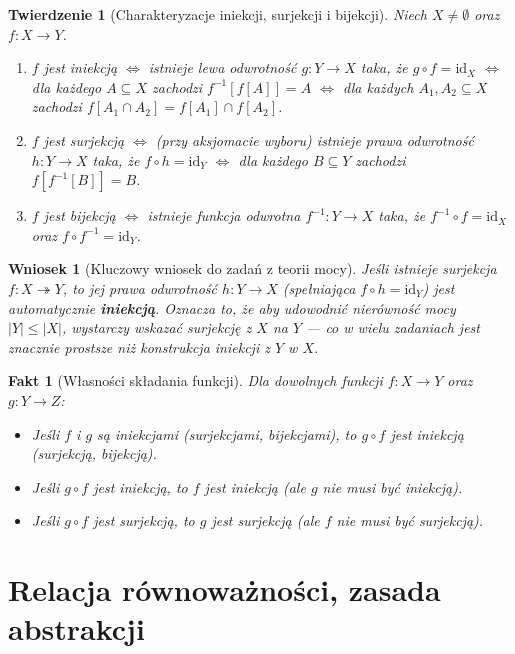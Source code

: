 \documentclass[11pt, a4paper]{article}
\theoremstyle{definition}
\theoremstyle{plain}
\newtheorem{twierdzenie}[definicja]{Twierdzenie}
\newtheorem{wniosek}[definicja]{Wniosek}
\newtheorem{fakt}[definicja]{Fakt}
\theoremstyle{remark}
\begin{document}
\begin{twierdzenie}[Charakteryzacje iniekcji, surjekcji i bijekcji]\label{tw:odwrotnosci}
Niech $X \neq \emptyset$ oraz $f : X \to Y$.
\begin{enumerate}
    \item $f$ jest iniekcją $\iff$ istnieje lewa odwrotność $g : Y \to X$ taka, że $g \circ f = \mathrm{id}_X$ $\iff$ dla każdego $A \subseteq X$ zachodzi $f^{-1}[f[A]] = A$ $\iff$ dla każdych $A_1, A_2 \subseteq X$ zachodzi $f[A_1 \cap A_2] = f[A_1] \cap f[A_2]$.
    \item $f$ jest surjekcją $\iff$ (przy aksjomacie wyboru) istnieje prawa odwrotność $h : Y \to X$ taka, że $f \circ h = \mathrm{id}_Y$ $\iff$ dla każdego $B \subseteq Y$ zachodzi $f[f^{-1}[B]] = B$.
    \item $f$ jest bijekcją $\iff$ istnieje funkcja odwrotna $f^{-1} : Y \to X$ taka, że $f^{-1} \circ f = \mathrm{id}_X$ oraz $f \circ f^{-1} = \mathrm{id}_Y$.
\end{enumerate}
\end{twierdzenie}

\begin{wniosek}[Kluczowy wniosek do zadań z teorii mocy]\label{wn:surjekcja-iniekcja}
Jeśli istnieje surjekcja $f : X \twoheadrightarrow Y$, to jej prawa odwrotność $h : Y \to X$ (spełniająca $f \circ h = \mathrm{id}_Y$) jest automatycznie \textbf{iniekcją}. Oznacza to, że aby udowodnić nierówność mocy $|Y| \le |X|$, wystarczy wskazać surjekcję z $X$ na $Y$ — co w wielu zadaniach jest znacznie prostsze niż konstrukcja iniekcji z $Y$ w $X$.
\end{wniosek}

\begin{fakt}[Własności składania funkcji]
Dla dowolnych funkcji $f : X \to Y$ oraz $g : Y \to Z$:
\begin{itemize}
    \item Jeśli $f$ i $g$ są iniekcjami (surjekcjami, bijekcjami), to $g \circ f$ jest iniekcją (surjekcją, bijekcją).
    \item Jeśli $g \circ f$ jest iniekcją, to $f$ jest iniekcją (ale $g$ nie musi być iniekcją).
    \item Jeśli $g \circ f$ jest surjekcją, to $g$ jest surjekcją (ale $f$ nie musi być surjekcją).
\end{itemize}
\end{fakt}

\section{Relacja równoważności, zasada abstrakcji}
\end{document}
